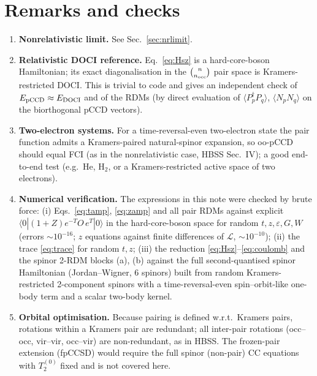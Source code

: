 \documentclass[11pt,a4paper]{article}
\newcommand{\Pd}[1]{P^{\dagger}_{#1}}
\newcommand{\Pa}[1]{P_{#1}}
\newcommand{\ev}[1]{\langle #1 \rangle}
\begin{document}
\section{Remarks and checks}

\begin{enumerate}
\item \textbf{Nonrelativistic limit.} See Sec.~\ref{sec:nrlimit}.

\item \textbf{Relativistic DOCI reference.} Eq.~\eqref{eq:Hsz} is a hard-core-boson Hamiltonian;
  its exact diagonalisation in the $\binom{n}{n_{\rm occ}}$ pair space is Kramers-restricted DOCI.
  This is trivial to code and gives an independent check of $E_{\rm pCCD}\approx E_{\rm DOCI}$ and of
  the RDMs (by direct evaluation of $\ev{\Pd p\Pa q}$, $\ev{N_pN_q}$ on the biorthogonal pCCD vectors).

\item \textbf{Two-electron systems.} For a time-reversal-even two-electron state the pair function
  admits a Kramers-paired natural-spinor expansion, so oo-pCCD should equal FCI (as in the
  nonrelativistic case, HBSS Sec.~IV); a good end-to-end test (e.g.\ He, H$_2$, or a Kramers-restricted
  active space of two electrons).

\item \textbf{Numerical verification.} The expressions in this note were checked by brute force:
  (i) Eqs.~\eqref{eq:tamp}, \eqref{eq:zamp} and all pair RDMs against explicit
  $\langle 0|(1+Z)e^{-T}O\,e^{T}|0\rangle$ in the hard-core-boson space for random $t,z,\varepsilon,G,W$
  (errors $\sim10^{-16}$; $z$ equations against finite differences of $\mathcal L$, $\sim10^{-10}$);
  (ii) the trace \eqref{eq:trace} for random $t,z$;
  (iii) the reduction \eqref{eq:Hsz}--\eqref{eq:coulomb} and the spinor 2-RDM blocks (a), (b)
  against the full second-quantised spinor Hamiltonian (Jordan--Wigner, 6 spinors) built from random
  Kramers-restricted 2-component spinors with a time-reversal-even spin--orbit-like one-body term
  and a scalar two-body kernel.

\item \textbf{Orbital optimisation.} Because pairing is defined w.r.t.\ Kramers pairs, rotations
  within a Kramers pair are redundant; all inter-pair rotations (occ--occ, vir--vir, occ--vir) are
  non-redundant, as in HBSS. The frozen-pair extension (fpCCSD) would require the full spinor
  (non-pair) CC equations with $T^{(0)}_2$ fixed and is not covered here.
\end{enumerate}
\end{document}
